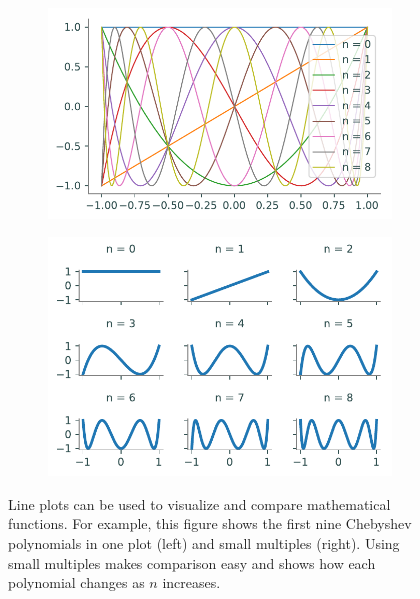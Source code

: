 \begin{figure}[H] %
    \centering
    \begin{subfigure}{.47\textwidth}
        \centering
        \includegraphics[width=\textwidth]{figures/chebyshev_bad.pdf}
    \end{subfigure}
    \begin{subfigure}{.52\textwidth}
        \centering
        \includegraphics[width=\textwidth]{figures/chebyshev_good.pdf}
    \end{subfigure}
    \caption{Line plots can be used to visualize and compare mathematical functions. For example, this figure shows the first nine Chebyshev polynomials in one plot (left) and small multiples (right). Using small multiples makes comparison easy and shows how each polynomial changes as $n$ increases.}
    \label{fig:chebyshev}
\end{figure}

